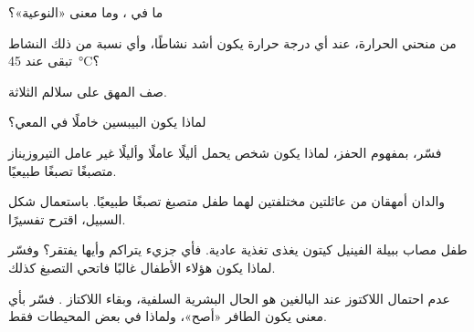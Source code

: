 \begin{exercise}[$\star$]\label{exo:g11:enzymes-and-phenotype:2}
ما  في ، وما معنى «النوعية»؟
\end{exercise}

\begin{exercise}[$\star$]\label{exo:g11:enzymes-and-phenotype:3}
من منحني الحرارة، عند أي درجة حرارة يكون  أشد نشاطًا، وأي نسبة
من ذلك النشاط تبقى عند \qty{45}{\celsius}؟
\end{exercise}

\begin{exercise}[$\star$]\label{exo:g11:enzymes-and-phenotype:4}
صف المهق على سلالم  الثلاثة.
\end{exercise}

\begin{exercise}[$\star$]\label{exo:g11:enzymes-and-phenotype:5}
لماذا يكون البيبسين خاملًا في المعي؟
\end{exercise}

\begin{exercise}[$\star\star$]\label{exo:g11:enzymes-and-phenotype:6}
فسّر، بمفهوم الحفز، لماذا يكون شخص يحمل أليلًا عاملًا وأليلًا غير عامل
 التيروزيناز متصبغًا تصبغًا طبيعيًا.
\end{exercise}

\begin{exercise}[$\star\star$]\label{exo:g11:enzymes-and-phenotype:7}
والدان أمهقان من عائلتين مختلفتين لهما طفل متصبغ تصبغًا طبيعيًا.
باستعمال شكل السبيل، اقترح تفسيرًا.
\end{exercise}

\begin{exercise}[$\star\star$]\label{exo:g11:enzymes-and-phenotype:8}
طفل مصاب ببيلة الفينيل كيتون يغذى تغذية عادية. فأي جزيء يتراكم وأيها
يفتقر؟ وفسّر لماذا يكون هؤلاء الأطفال غالبًا فاتحي التصبغ كذلك.
\end{exercise}

\begin{exercise}[$\star\star$]\label{exo:g11:enzymes-and-phenotype:9}
عدم احتمال اللاكتوز عند البالغين هو الحال البشرية السلفية، وبقاء
اللاكتاز . فسّر بأي معنى يكون  الطافر «أصح»، ولماذا
في بعض المحيطات فقط.
\end{exercise}

